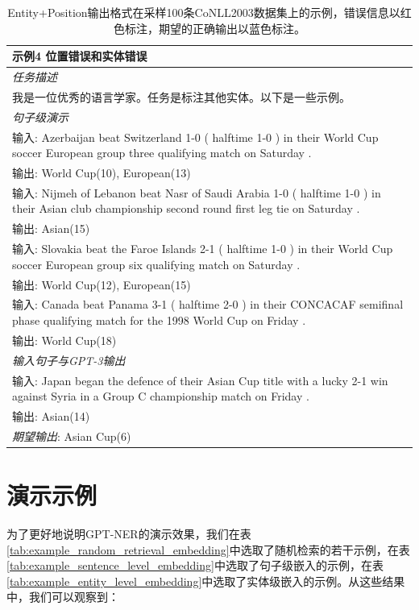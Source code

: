 \documentclass[supercite]{Experimental_Report}
\theoremstyle{definition}
\begin{document}
\begin{table}[th!]
{\begin{tabular}{l}
\textbf{示例4 {\color{red} 位置错误和实体错误}} \\\midrule
\textit{任务描述} \\
我是一位优秀的语言学家。任务是标注其他实体。以下是一些示例。 \\
\textit{句子级演示} \\
输入: Azerbaijan beat Switzerland 1-0 ( halftime 1-0 ) in their World Cup soccer European group three qualifying match on Saturday . \\
输出: World Cup(10), European(13) \\
输入: Nijmeh of Lebanon beat Nasr of Saudi Arabia 1-0 ( halftime 1-0 ) in their Asian club championship second round first leg tie on Saturday . \\
输出: Asian(15) \\
输入: Slovakia beat the Faroe Islands 2-1 ( halftime 1-0 ) in their World Cup soccer European group six qualifying match on Saturday . \\
输出: World Cup(12), European(15) \\
输入: Canada beat Panama 3-1 ( halftime 2-0 ) in their CONCACAF semifinal phase qualifying match for the 1998 World Cup on Friday . \\
输出: World Cup(18) \\\midrule
\textit{输入句子与GPT-3输出} \\
输入: Japan began the defence of their Asian Cup title with a lucky 2-1 win against Syria in a Group C championship match on Friday . \\
输出: Asian(14) \\
{\color{blue}\it 期望输出}: Asian Cup(6) \\\bottomrule
    \end{tabular}
    }
     \caption{Entity+Position输出格式在采样100条CoNLL2003数据集上的示例，错误信息以红色标注，期望的正确输出以蓝色标注。}
    \label{tab:entity_position_format}
\end{table}

\section{演示示例}
\label{demonstrations_examples}

为了更好地说明GPT-NER的演示效果，我们在表\ref{tab:example_random_retrieval_embedding}中选取了随机检索的若干示例，在表\ref{tab:example_sentence_level_embedding}中选取了句子级嵌入的示例，在表\ref{tab:example_entity_level_embedding}中选取了实体级嵌入的示例。从这些结果中，我们可以观察到：
\end{document}
